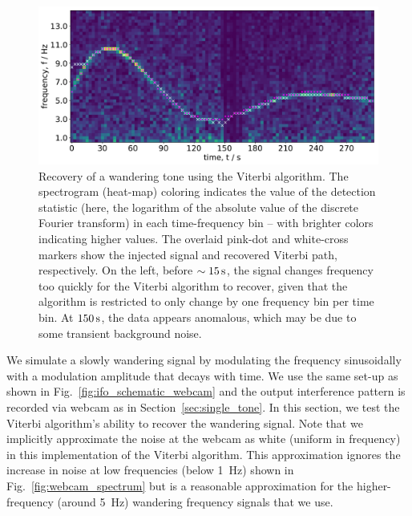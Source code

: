 \documentclass[paper-main.tex]{subfiles}
\begin{document}
\begin{figure}
	\includegraphics[width=\textwidth]{figures/expt_overlay_2_viterbi_test_webcam.pdf}
	\caption{\label{fig:viterbi_overlay}
Recovery of a wandering tone using the Viterbi algorithm.
The spectrogram (heat-map) coloring indicates the value of the detection statistic (here, the logarithm of the absolute value of the discrete Fourier transform) in each time-frequency bin -- with brighter colors indicating higher values. 
The overlaid pink-dot and white-cross markers show the injected signal and recovered Viterbi path, respectively. 
On the left, before $\sim 15\,{\rm s}$, the signal changes frequency too quickly for the Viterbi algorithm to recover, given that the algorithm is restricted to only change by one frequency bin per time bin. 
At $150\,{\rm s}$, the data appears anomalous, which may be due to some transient background noise. }
\end{figure}
 

We simulate a slowly wandering signal by modulating the frequency sinusoidally with a modulation amplitude that decays with time. 
We use the same set-up as shown in Fig.~\ref{fig:ifo_schematic_webcam} and the output interference pattern is recorded via webcam as in Section~\ref{sec:single_tone}. 
In this section, we test the Viterbi algorithm’s ability to recover the wandering signal. 
Note that we implicitly approximate the noise at the webcam as white (uniform in frequency) in this implementation of the Viterbi algorithm. 
This approximation ignores the increase in noise at low frequencies (below 1~Hz) shown in Fig.~\ref{fig:webcam_spectrum} but is a reasonable approximation for the higher-frequency (around 5~Hz) wandering frequency signals that we use.
\end{document}
